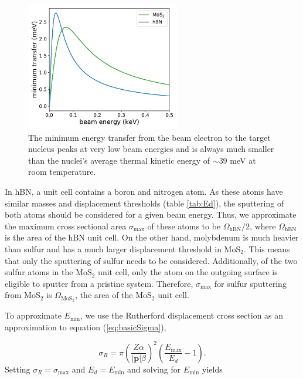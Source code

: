 \documentclass{article}
\begin{document}
\begin{figure}[H]
  \centering
  \includegraphics[width=0.6\textwidth]{figures/emin.pdf}
  \caption{
    The minimum energy transfer from the beam electron to the target nucleus
    peaks at very low beam energies and is always much smaller than the
    nuclei's average thermal kinetic energy of $\sim$39 meV at room
    temperature. 
  }
  \label{fig:Emin}
\end{figure}

In hBN, a unit cell contains a boron and nitrogen atom.
As these atoms have similar masses and displacement thresholds (table
\ref{tab:Ed}), the sputtering of both atoms should be considered for a given
beam energy.
Thus, we approximate the maximum cross sectional area $\sigma_\text{max}$ of
these atoms to be $\Omega_\text{hBN}/2$, where $\Omega_\text{hBN}$ is the area
of the hBN unit cell.
On the other hand, molybdenum is much heavier than sulfur and has a much larger
displacement threshold in MoS$_2$.\cite{Komsa2012}  
This means that only the sputtering of sulfur needs to be considered.
Additionally, of the two sulfur atoms in the MoS$_2$ unit cell, only the atom
on the outgoing surface is eligible to sputter from a pristine system.
\cite{Komsa2012}
Therefore, $\sigma_\text{max}$ for sulfur sputtering from MoS$_2$ is
$\Omega_\text{MoS$_2$}$, the area of the MoS$_2$ unit cell.

To approximate $E_\text{min}$, we use the Rutherford displacement cross section
\cite{Thornton2004, Sakurai2011, Yoshimura2018} as an approximation to equation
(\ref{eq:basicSigma}),

\begin{equation}
  \sigma_R
  =
  \pi\left(\frac{Z\alpha}{|\mathbf{p}|\beta}\right)^2
  \left(\frac{E_\text{max}}{E_d} - 1\right).
  \label{eq:Rutherford}
\end{equation}
%
Setting $\sigma_R=\sigma_\text{max}$ and $E_d=E_\text{min}$ and solving for
$E_\text{min}$ yields
\end{document}
